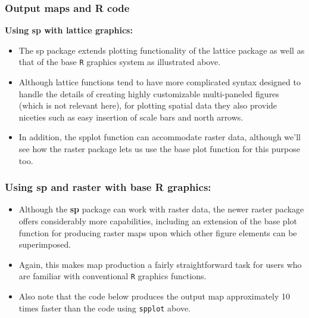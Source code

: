 \documentclass{beamer}
\begin{document}
\begin{frame}
\frametitle{
Output maps and R code}
\textbf{Using sp with lattice graphics:}
\begin{itemize}
\item The sp package extends plotting functionality of the lattice package as well as that of the base \texttt{R} graphics system as illustrated above. 
\item Although lattice functions tend to have more complicated syntax designed to handle the details of creating highly customizable multi-paneled figures (which is not relevant here), for plotting spatial data they also provide niceties such as easy insertion of scale bars and north arrows. 
\item 
In addition, the spplot function can accommodate raster data, although we'll see how the raster package lets us use the base plot function for this purpose too.
\end{itemize}
\end{frame}
\begin{frame}
\frametitle{Using sp and raster with base R graphics:}
\begin{itemize}
\item 
Although the \textbf{sp} package can work with raster data, the newer raster package offers considerably more capabilities, including an extension of the base plot function for producing raster maps upon which other figure elements can be superimposed.\item  Again, this makes map production a fairly straightforward task for users who are familiar with conventional \texttt{R} graphics functions.\item  Also note that the code below produces the output map approximately 10 times faster than the code using \texttt{spplot} above.
\end{itemize}
\end{frame}
\end{document}
